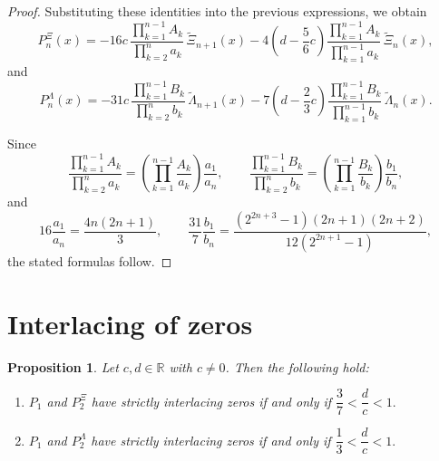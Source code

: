 \documentclass[11pt,twoside]{article}
\newtheorem{proposition}[theorem]{Proposition}
\numberwithin{equation}{section}
\begin{document}
\begin{proof}
Substituting these identities into the previous expressions, we obtain
\[
P_n^\Xi(x)
=
-16c\,
\frac{\displaystyle\prod_{k=1}^{n-1}A_k}{\displaystyle\prod_{k=2}^{n}a_k}\,
\widetilde{\Xi}_{n+1}(x)
-
4\left(d-\frac56c\right)
\frac{\displaystyle\prod_{k=1}^{n-1}A_k}{\displaystyle\prod_{k=1}^{n-1}a_k}\,
\widetilde{\Xi}_n(x),
\]
and
\[
P_n^\Lambda(x)
=
-31c\,
\frac{\displaystyle\prod_{k=1}^{n-1}B_k}{\displaystyle\prod_{k=2}^{n}b_k}\,
\widetilde{\Lambda}_{n+1}(x)
-
7\left(d-\frac23c\right)
\frac{\displaystyle\prod_{k=1}^{n-1}B_k}{\displaystyle\prod_{k=1}^{n-1}b_k}\,
\widetilde{\Lambda}_n(x).
\]

Since
\[
\frac{\displaystyle\prod_{k=1}^{n-1}A_k}{\displaystyle\prod_{k=2}^{n}a_k}
=
\left(\displaystyle\prod_{k=1}^{n-1}\frac{A_k}{a_k}\right)\frac{a_1}{a_n},
\qquad
\frac{\displaystyle\prod_{k=1}^{n-1}B_k}{\displaystyle\prod_{k=2}^{n}b_k}
=
\left(\displaystyle\prod_{k=1}^{n-1}\frac{B_k}{b_k}\right)\frac{b_1}{b_n},
\]
and
\[
16\frac{a_1}{a_n}=\frac{4n(2n+1)}{3},
\qquad
\frac{31}{7}\frac{b_1}{b_n}
=
\frac{(2^{2n+3}-1)(2n+1)(2n+2)}{12(2^{2n+1}-1)},
\]
the stated formulas follow.
\end{proof}

\section{Interlacing of zeros}

\begin{proposition}
Let \(c,d \in \mathbb{R}\) with \(c \neq 0\). Then the following hold:
\begin{enumerate}
    \item \(P_1\) and \(P_2^{\Xi}\) have strictly interlacing zeros if and only if
    \(
    \dfrac{3}{7}<\dfrac{d}{c}<1.
    \)
    \item \(P_1\) and \(P_2^{\Lambda}\) have strictly interlacing zeros if and only if
    \(
    \dfrac{1}{3}<\dfrac{d}{c}<1.
    \)
\end{enumerate}
\end{proposition}
\end{document}
